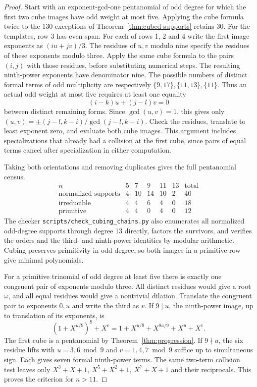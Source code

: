 \documentclass[11pt]{article}
\begin{document}
\begin{proof}
Start with an exponent-gcd-one pentanomial of odd degree for which the
first two cube images have odd weight at most five. Applying the cube
formula twice to the 130 exceptions of Theorem~\ref{thm:cubed-supports}
retains 30. For the templates, row 3 has even span. For each of
rows 1, 2 and 4 write the first image exponents as \((iu+jv)/3\).
The residues of \(u,v\) modulo nine specify the residues of these
exponents modulo three. Apply the same cube formula to the pairs
\((i,j)\) with those residues, before substituting numerical steps.
The resulting ninth-power exponents have denominator nine. The
possible numbers of distinct formal terms of odd multiplicity are
respectively \(\{9,17\},\{11,13\},\{11\}\).
Thus an actual odd weight at most five requires at least one equality
\[
    (i-k)u+(j-l)v=0
\]
between distinct remaining forms. Since \(\gcd(u,v)=1\), this gives
only \((u,v)=\pm(j-l,k-i)/\gcd(j-l,k-i)\). Check the residues,
translate to least exponent zero, and evaluate both cube images.
This argument includes specializations that already had a collision
at the first cube, since pairs of equal terms cancel after specialization
in either computation.

Taking both orientations and removing duplicates gives the full
pentanomial census.
\[
\begin{array}{c|rrrrr|r}
n&5&7&9&11&13&\text{total}\\\hline
\text{normalized supports}&4&10&14&10&2&40\\
\text{irreducible}&4&4&6&4&0&18\\
\text{primitive}&4&4&0&4&0&12
\end{array}
\]
The checker \nolinkurl{scripts/check_cubing_chains.py} also enumerates
all normalized odd-degree supports through degree 13 directly, factors
the survivors, and verifies the orders and the third- and ninth-power
identities by modular arithmetic. Cubing preserves primitivity in odd
degree, so both images in a primitive row give minimal polynomials.

For a primitive trinomial of odd degree at least five there is exactly
one congruent pair of exponents modulo three. All distinct residues
would give a root \(\omega\), and all equal residues would give a
nontrivial dilation. Translate the congruent pair to exponents \(0,u\)
and write the third as \(v\). If \(9\mid u\), the ninth-power image,
up to translation of its exponents, is
\[
        (1+X^{u/9})^9+X^v
        =1+X^{u/9}+X^{8u/9}+X^u+X^v .
\]
The first cube is a pentanomial by Theorem~\ref{thm:progression}.
If \(9\nmid u\), the six residue lifts with \(u=3,6\bmod9\) and
\(v=1,4,7\bmod9\) suffice up to simultaneous sign. Each gives seven
formal ninth-power terms. The same two-term collision test leaves
only \(X^3+X+1,\ X^5+X^2+1,\ X^7+X+1\) and their reciprocals.
This proves the criterion for \(n>11\).


\end{proof}
\end{document}
